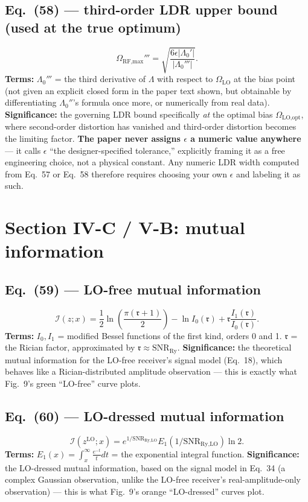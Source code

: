 \documentclass[11pt]{article}
\begin{document}
\subsection*{Eq.~(58) --- third-order LDR upper bound (used at the true optimum)}
\begin{equation}
\Omega_\text{RF,max}''' = \sqrt{\frac{6\epsilon|\Lambda_0'|}{|\Lambda_0'''|}}. \tag{58}
\end{equation}
\textbf{Terms:} $\Lambda_0'''$ = the third derivative of $\Lambda$ with
respect to $\Omega_\text{LO}$ at the bias point (not given an explicit
closed form in the paper text shown, but obtainable by differentiating
$\Lambda_0''$'s formula once more, or numerically from real data).
\textbf{Significance:} the governing LDR bound specifically \emph{at}
the optimal bias $\Omega_\text{LO,opt}$, where second-order distortion
has vanished and third-order distortion becomes the limiting factor.
\textbf{The paper never assigns $\epsilon$ a numeric value anywhere} ---
it calls $\epsilon$ ``the designer-specified tolerance,'' explicitly
framing it as a free engineering choice, not a physical constant. Any
numeric LDR width computed from Eq.~57 or Eq.~58 therefore requires
choosing your own $\epsilon$ and labeling it as such.

\section{Section IV-C / V-B: mutual information}

\subsection*{Eq.~(59) --- LO-free mutual information}
\begin{equation}
\mathcal I(z;x) = \frac12\ln\left(\frac{\pi(\mathfrak r+1)}{2}\right)-\ln I_0(\mathfrak r)+\mathfrak r\frac{I_1(\mathfrak r)}{I_0(\mathfrak r)}. \tag{59}
\end{equation}
\textbf{Terms:} $I_0,I_1$ = modified Bessel functions of the first
kind, orders 0 and 1. $\mathfrak r$ = the Rician factor, approximated by
$\mathfrak r\approx\text{SNR}_\text{Ry}$.
\textbf{Significance:} the theoretical mutual information for the
LO-free receiver's signal model (Eq.~18), which behaves like a
Rician-distributed amplitude observation --- this is exactly what
Fig.~9's green ``LO-free'' curve plots.

\subsection*{Eq.~(60) --- LO-dressed mutual information}
\begin{equation}
\mathcal I(z^\text{LO};x) = e^{1/\text{SNR}_\text{Ry,LO}}E_1(1/\text{SNR}_\text{Ry,LO})\ln2. \tag{60}
\end{equation}
\textbf{Terms:} $E_1(x)=\int_x^\infty\frac{e^{-t}}{t}dt$ = the
exponential integral function.
\textbf{Significance:} the LO-dressed mutual information, based on the
signal model in Eq.~34 (a complex Gaussian observation, unlike the
LO-free receiver's real-amplitude-only observation) --- this is what
Fig.~9's orange ``LO-dressed'' curves plot.
\end{document}
